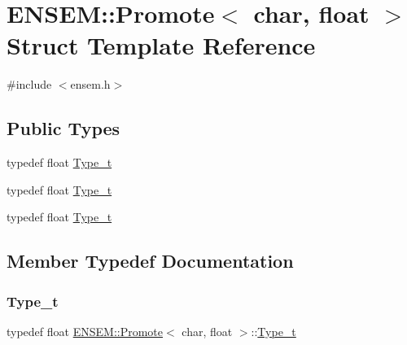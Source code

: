 \hypertarget{structENSEM_1_1Promote_3_01char_00_01float_01_4}{}\section{E\+N\+S\+EM\+:\+:Promote$<$ char, float $>$ Struct Template Reference}
\label{structENSEM_1_1Promote_3_01char_00_01float_01_4}


{\ttfamily \#include $<$ensem.\+h$>$}

\subsection*{Public Types}
\begin{DoxyCompactItemize}
\item 
typedef float \mbox{\hyperlink{structENSEM_1_1Promote_3_01char_00_01float_01_4_ab888f85116b883e8bcc31eb0c1a7a6da}{Type\+\_\+t}}
\item 
typedef float \mbox{\hyperlink{structENSEM_1_1Promote_3_01char_00_01float_01_4_ab888f85116b883e8bcc31eb0c1a7a6da}{Type\+\_\+t}}
\item 
typedef float \mbox{\hyperlink{structENSEM_1_1Promote_3_01char_00_01float_01_4_ab888f85116b883e8bcc31eb0c1a7a6da}{Type\+\_\+t}}
\end{DoxyCompactItemize}


\subsection{Member Typedef Documentation}
\mbox{\label{structENSEM_1_1Promote_3_01char_00_01float_01_4_ab888f85116b883e8bcc31eb0c1a7a6da}} 
\subsubsection{\texorpdfstring{Type\_t}{Type\_t}\hspace{0.1cm}{\footnotesize\ttfamily [1/3]}}
{\footnotesize\ttfamily typedef float \mbox{\hyperlink{structENSEM_1_1Promote}{E\+N\+S\+E\+M\+::\+Promote}}$<$ char, float $>$\+::\mbox{\hyperlink{structENSEM_1_1Promote_3_01char_00_01float_01_4_ab888f85116b883e8bcc31eb0c1a7a6da}{Type\+\_\+t}}}

